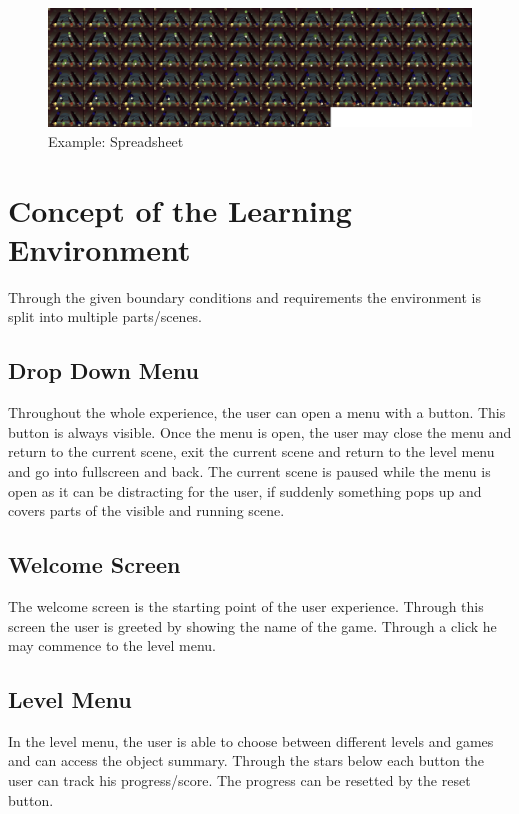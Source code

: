 \begin{figure}[H]
    \centering
    \includegraphics[width=1\textwidth]{figures/spreadsheet}
    \caption{Example: Spreadsheet}
    \label{fig:spreadsheet}
\end{figure}

\section{Concept of the Learning Environment}\label{sec:concept-of-the-learning-environment}
Through the given boundary conditions and requirements the environment is split into multiple parts/scenes.

\subsection{Drop Down Menu}\label{subsec:drop-down-menu}
Throughout the whole experience, the user can open a menu with a button.
This button is always visible.
Once the menu is open, the user may close the menu and return to the current scene,
exit the current scene and return to the level menu and go into fullscreen and back.
The current scene is paused while the menu is open as it can be distracting for the user,
if suddenly something pops up and covers parts of the visible and running scene.

\subsection{Welcome Screen}\label{subsec:welcome-screen}
The welcome screen is the starting point of the user experience.
Through this screen the user is greeted by showing the name of the game.
Through a click he may commence to the level menu.

\subsection{Level Menu}\label{subsec:level-menu}
In the level menu, the user is able to choose between different levels and games and can access the object summary.
Through the stars below each button the user can track his progress/score.
The progress can be resetted by the reset button.

